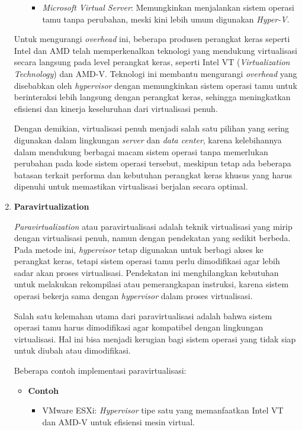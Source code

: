 \documentclass[12pt]{article}
\begin{document}
\begin{enumerate}
\begin{itemize}
\begin{itemize}
            \item \textit{Microsoft Virtual Server}: Memungkinkan menjalankan sistem operasi tamu tanpa perubahan, meski kini lebih umum digunakan \textit{Hyper-V}.
        \end{itemize}
    \end{itemize}
    
    \par Untuk mengurangi \textit{overhead} ini, beberapa produsen perangkat keras seperti Intel dan AMD telah memperkenalkan teknologi yang mendukung virtualisasi secara langsung pada level perangkat keras, seperti Intel VT (\textit{Virtualization Technology}) dan AMD-V. Teknologi ini membantu mengurangi \textit{overhead} yang disebabkan oleh \textit{hypervisor} dengan memungkinkan sistem operasi tamu untuk berinteraksi lebih langsung dengan perangkat keras, sehingga meningkatkan efisiensi dan kinerja keseluruhan dari virtualisasi penuh.
    
    \par Dengan demikian, virtualisasi penuh menjadi salah satu pilihan yang sering digunakan dalam lingkungan \textit{server} dan \textit{data center}, karena kelebihannya dalam mendukung berbagai macam sistem operasi tanpa memerlukan perubahan pada kode sistem operasi tersebut, meskipun tetap ada beberapa batasan terkait performa dan kebutuhan perangkat keras khusus yang harus dipenuhi untuk memastikan virtualisasi berjalan secara optimal.

    \item \textbf{Paravirtualization}
    \par \textit{Paravirtualization} atau paravirtualisasi adalah teknik virtualisasi yang mirip dengan virtualisasi penuh, namun dengan pendekatan yang sedikit berbeda. Pada metode ini, \textit{hypervisor} tetap digunakan untuk berbagi akses ke perangkat keras, tetapi sistem operasi tamu perlu dimodifikasi agar lebih sadar akan proses virtualisasi. Pendekatan ini menghilangkan kebutuhan untuk melakukan rekompilasi atau pemerangkapan instruksi, karena sistem operasi bekerja sama dengan \textit{hypervisor} dalam proses virtualisasi.

    \par Salah satu kelemahan utama dari paravirtualisasi adalah bahwa sistem operasi tamu harus dimodifikasi agar kompatibel dengan lingkungan virtualisasi. Hal ini bisa menjadi kerugian bagi sistem operasi yang tidak siap untuk diubah atau dimodifikasi. 
    
    \par Beberapa contoh implementasi paravirtualisasi:
    \begin{itemize}
        \item \textbf{Contoh}
        \begin{itemize}
            \item VMware ESXi: \textit{Hypervisor} tipe satu yang memanfaatkan Intel VT dan AMD-V untuk efisiensi mesin virtual.


\end{itemize}
\end{itemize}
\end{enumerate}
\end{document}
